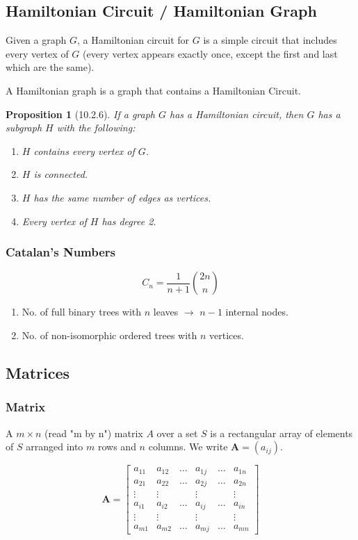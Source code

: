 \documentclass{article}
\theoremstyle{plain}
\newtheorem{proposition}[theorem]{Proposition}
\theoremstyle{definition}
\theoremstyle{remark}
\begin{document}
\subsection{Hamiltonian Circuit / Hamiltonian Graph}
Given a graph $G$, a Hamiltonian circuit for $G$ is a simple circuit that includes every vertex of $G$ (every vertex appears exactly once, except the first and last which are the same).
 
A Hamiltonian graph is a graph that contains a Hamiltonian Circuit.
 
\begin{proposition}[10.2.6]
    If a graph $G$ has a Hamiltonian circuit, then $G$ has a subgraph $H$ with the following:
    \begin{enumerate}
        \item $H$ contains every vertex of $G$.
        \item $H$ is connected.
        \item $H$ has the same number of edges as vertices.
        \item Every vertex of $H$ has degree 2.
    \end{enumerate}
\end{proposition}
 
\subsubsection*{Catalan's Numbers}
\[ C_n = \frac{1}{n+1}\binom{2n}{n} \]
\begin{enumerate}
    \item No. of full binary trees with $n$ leaves $\to$ $n-1$ internal nodes.
    \item No. of non-isomorphic ordered trees with $n$ vertices.
\end{enumerate}
 
\subsection{Matrices}
 
\subsubsection*{Matrix}
A $m \times n$ (read "m by n") matrix $A$ over a set $S$ is a rectangular array of elements of $S$ arranged into $m$ rows and $n$ columns. We write $\mathbf{A} = (a_{ij})$.
 
\[
\mathbf{A} =
\begin{bmatrix}
a_{11} & a_{12} & \dots & a_{1j} & \dots & a_{1n} \\
a_{21} & a_{22} & \dots & a_{2j} & \dots & a_{2n} \\
\vdots & \vdots & & \vdots & & \vdots \\
a_{i1} & a_{i2} & \dots & a_{ij} & \dots & a_{in} \\
\vdots & \vdots & & \vdots & & \vdots \\
a_{m1} & a_{m2} & \dots & a_{mj} & \dots & a_{mn}
\end{bmatrix}
\]
 
\end{document}
